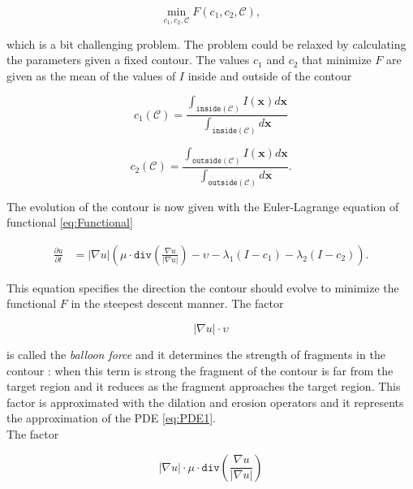 \begin{equation}
	\min_{c_1,c_2, \mathcal{C}} F(c_1,c_2, \mathcal{C}),
\end{equation}

which is a bit challenging problem. The problem could be relaxed by calculating the parameters given a fixed contour. The values $c_1$ and $c_2$ that minimize $F$ are given as the mean of the values of $I$ inside and outside of the contour
	
\begin{equation}
	c_1(\mathcal{C}) = \frac{\int_{\mathtt{inside}(\mathcal{C})}I(\mathbf{x})d\mathbf{x}}{\int_{\mathtt{inside}(\mathcal{C})}d\mathbf{x}}
\end{equation}

\begin{equation}
	c_2(\mathcal{C}) = \frac{\int_{\mathtt{outside}(\mathcal{C})}I(\mathbf{x})d\mathbf{x}}{\int_{\mathtt{outside}(\mathcal{C})}d\mathbf{x}}.
\end{equation}

The evolution of the contour is now given with the Euler-Lagrange equation of functional \ref{eq:Functional}

\begin{equation}
	\begin{split}
		\frac{\partial u}{\partial t} & = | \nabla u | \left ( \mu \cdot \mathtt{div} \left ( \frac{\nabla u}{|\nabla u|}  \right ) - \upsilon - \lambda_1(I - c_1) -\lambda_2 (I - c_2) \right ) .
	\end{split}
\end{equation}

This equation specifies the direction the contour should evolve to minimize the functional $F$ in the steepest descent manner. The factor 

\begin{equation}
	|\nabla u| \cdot \upsilon
\end{equation} 

is called the \textit{balloon force} and it determines the strength of fragments in the contour : when this term is strong the fragment of the contour is far from the target region and it reduces as the fragment approaches the target region. This factor is approximated with the dilation and erosion operators and it represents the approximation of the PDE \ref{eq:PDE1}. \\

The factor

\begin{equation}
	| \nabla u | \cdot \mu \cdot \mathtt{div} \left ( \frac{\nabla u}{|\nabla u|}  \right )
\end{equation}


